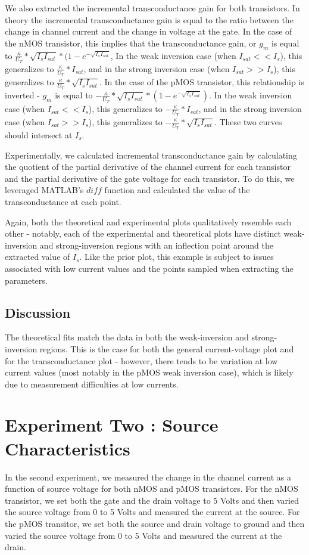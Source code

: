 \documentclass{article}
\begin{document}
We also extracted the incremental transconductance gain for both transistors. In theory the incremental transconductance gain is equal to the ratio between the change in channel current and the change in voltage at the gate. In the case of the nMOS transistor, this implies that the transconductance gain, or $g_m$ is equal to $\frac{\kappa}{U_T}*\sqrt{I_sI_{sat}} * (1 - e^{-\sqrt{I_sI_{sat}}}$, In the weak inversion case (when $I_{sat} << I_s$), this generalizes to $\frac{\kappa}{U_T}*I_{sat}$, and in the strong inversion case (when $I_{sat} >> I_s$), this generalizes to $\frac{\kappa}{U_T}*\sqrt{I_sI_{sat}}$. In the case of the pMOS transistor, this relationship is inverted - $g_m$ is equal to $-\frac{\kappa}{U_T}*\sqrt{I_sI_{sat}} * (1 - e^{-\sqrt{I_sI_{sat}}})$. In the weak inversion case (when $I_{sat} << I_s$), this generalizes to $-\frac{\kappa}{U_T}*I_{sat}$, and in the strong inversion case (when $I_{sat} >> I_s$), this generalizes to $-\frac{\kappa}{U_T}*\sqrt{I_sI_{sat}}$. These two curves should intersect at $I_s$.

Experimentally, we calculated incremental transconductance gain by calculating the quotient of the partial derivative of the channel current for each transistor and the partial derivative of the gate voltage for each transistor. To do this, we leveraged MATLAB's $diff$ function and calculated the value of the transconductance at each point.

Again, both the theoretical and experimental plots qualitatively resemble each other - notably, each of the experimental and theoretical plots have distinct weak-inversion and strong-inversion regions with an inflection point around the extracted value of $I_s$. Like the prior plot, this example is subject to issues associated with low current values and the points sampled when extracting the parameters.

\subsection{Discussion}
The theoretical fits match the data in both the weak-inversion and strong-inversion regions. This is the case for both the general current-voltage plot and for the transconductance plot - however, there tends to be variation at low current values (most notably in the pMOS weak inversion case), which is likely due to measurement difficulties at low currents. 

\section{Experiment Two : Source Characteristics}
In the second experiment, we measured the change in the channel current as a function of source voltage for both nMOS and pMOS transistors. For the nMOS transistor, we set both the gate and the drain voltage to 5 Volts and then varied the source voltage from 0 to 5 Volts and measured the current at the source. For the pMOS transitor, we set both the source and drain voltage to ground and then varied the source voltage from 0 to 5 Volts and measured the current at the drain. 
\end{document}
